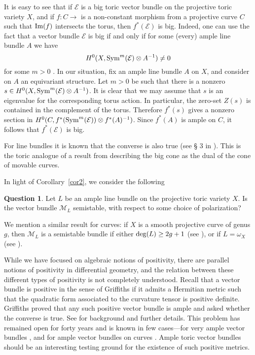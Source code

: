 \documentclass[12pt]{amsart}
\theoremstyle{definition}
\newtheorem{question}[lemma]{Question}
\theoremstyle{remark}
\begin{document}
It is easy to see that if ${\mathcal{E}}$ is a big toric vector bundle on the
projective toric variety $X$, and if $f\colon C{\xrightarrow{\ \ }}$ is a
non-constant morphism from a projective curve $C$ such that ${\rm
Im}(f)$ intersects the torus, then $f^*({\mathcal{E}})$ is big. Indeed, one
can use the fact that a vector bundle ${\mathcal{E}}$ is big if and only if for some
(every) ample line bundle $A$ we have
$$H^0(X,{\rm Sym}^m({\mathcal{E}})\otimes A^{-1})\neq 0$$
for some $m>0$ \cite[Example~6.1.23]{positivity}. In our
situation, fix an ample line bundle $A$ on $X$, and consider on $A$
an equivariant structure. Let $m>0$ be such that there is a nonzero
$s\in H^0(X,{\rm Sym}^m({\mathcal{E}})\otimes A^{-1})$. It is clear that we
may assume that $s$ is an eigenvalue for the corresponding torus
action. In particular, the zero-set $Z(s)$ is contained in the
complement of the torus. Therefore $f^*(s)$ gives a nonzero section
in $H^0(C,f^*({\rm Sym}^m({\mathcal{E}}))\otimes f^*(A)^{-1})$. Since $f^*(A)$ is ample on
$C$, it follows that $f^*({\mathcal{E}})$ is big.

For line bundles it is known that the converse is also true (see \S
3 in \cite{Payne3}). This is the toric analogue of a result from
\cite{BDPP} describing the big cone as the dual of the cone of
movable curves.

\bigskip

In light of Corollary~\ref{cor2}, we consider the following

\begin{question}\label{q6}
Let $L$ be an ample line bundle on the projective toric variety $X$.
Is the vector bundle ${\mathcal{M}}_L$ semistable, with respect to some choice of polarization?
\end{question}

We mention a similar result for curves: if $X$ is
a smooth projective curve of genus $g$, then ${\mathcal{M}}_L$ is a semistable
bundle if either ${\rm deg}(L)\geq 2g+1$ (see \cite{EL}), or if
$L=\omega_X$ (see \cite{PR}).

\bigskip

While we have focused on algebraic notions of positivity, there are parallel notions of positivity in differential geometry, and the relation between these different types of positivity 
is not completely understood.  Recall that a vector bundle is positive in the sense of Griffiths if it admits a Hermitian metric such that the quadratic form associated to the curvature tensor is positive definite.  Griffiths proved that any such positive vector bundle is ample and asked whether the converse is true.  See \cite{Griffiths} for background and further details.  This problem has remained open for forty years and is known in few cases---for very ample vector bundles \cite[Theorem~A]{Griffiths}, and for ample vector bundles on curves \cite{CampanaFlenner}.  Ample toric vector bundles should be an interesting testing ground for the existence of such positive metrics.
\end{document}
